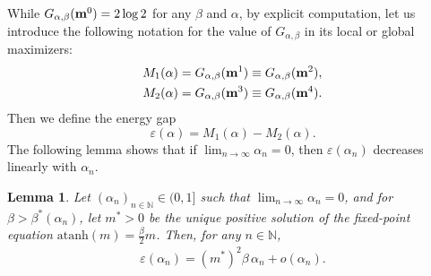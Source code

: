 \documentclass[11pt,oneside]{amsart}
\numberwithin{equation}{section}  %
\theoremstyle{plain}
\newtheorem{lemma}[theorem]{Lemma}
\theoremstyle{remark}
\def \N {{\mathbb N}}
\def \bm {{\bf m}}
\begin{document}
While $G_{\alpha,\beta}(\bm^0)=2\log2$ for any $\beta$ and $\alpha$, 
by explicit computation, let us introduce the following notation 
for the value of $G_{\alpha,\beta}$ in its local or global maximizers:
\begin{equation}\label{Max}
\begin{split}
&M_1(\alpha)=G_{\alpha,\beta}(\bm^1)\equiv G_{\alpha,\beta}(\bm^2),\\
&M_2(\alpha)=G_{\alpha,\beta}(\bm^3)\equiv G_{\alpha,\beta}(\bm^4).
\end{split}
\end{equation}
Then we define the energy gap
\begin{equation}
\label{def:M1M2}
 \varepsilon(\alpha)= M_1(\alpha)-M_2(\alpha).
\end{equation}
The following lemma shows that if $\lim_{n \to \infty}\alpha_n=0$, then $\varepsilon(\alpha_n)$  decreases linearly with $\alpha_n$. 
\begin{lemma}\label{lem:epsilonalpha}
Let $(\alpha_n)_{n\in\N}\in (0,1]$ such that $\lim_{n\to\infty}\alpha_n=0$, and for $\beta>\beta^*(\alpha_n)$, 
let $m^*>0$ be the unique positive solution of the fixed-point equation $\mathrm{atanh}(m)=\frac{\beta}{2}m$.
Then, for any $n\in \N$,
\begin{align*}
\varepsilon(\alpha_n)=(m^*)^2\beta \, \alpha_n + o(\alpha_n).
\end{align*}
\end{lemma}
\end{document}
